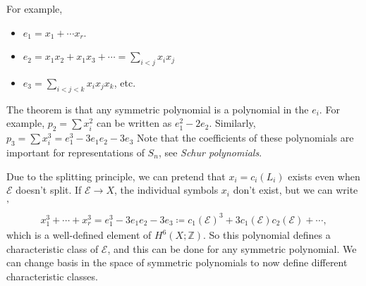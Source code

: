 \begin{example}[?]

For example,

\begin{itemize}
\item
  \(e_1 = x_1 + \cdots x_r\).
\item
  \(e_2 = x_1 x_2 + x_1 x_3 + \cdots = \sum_{i < j} x_i x_j\)
\item
  \(e_3 = \sum_{i<j<k} x_i x_j x_k\), etc.
\end{itemize}

\end{example}

\begin{remark}

The theorem is that any symmetric polynomial is a polynomial in the
\(e_i\). For example, \(p_2 = \sum x_i^2\) can be written as
\(e_1^2 - 2e_2\). Similarly,
\(p_3 = \sum x_i^3 = e_1^3 - 3e_1 e_2 -3e_3\) Note that the coefficients
of these polynomials are important for representations of \(S_n\), see
\emph{Schur polynomials}.

\end{remark}

\begin{remark}

Due to the splitting principle, we can pretend that \(x_i = c_i(L_i)\)
exists even when \(\mathcal{E}\) doesn't split. If
\(\mathcal{E} \to X\), the individual symbols \(x_i\) don't exist, but
we can write '
\begin{align*}
x_1^3 + \cdots + x_r^3 = e_1^3 - 3e_1 e_2 - 3e_3 \coloneqq c_1(\mathcal{E})^3 + 3c_1(\mathcal{E}) c_2(\mathcal{E}) + \cdots
,\end{align*}
which is a well-defined element of \(H^6(X; {\mathbb{Z}})\). So this
polynomial defines a characteristic class of \(\mathcal{E}\), and this
can be done for any symmetric polynomial. We can change basis in the
space of symmetric polynomials to now define different characteristic
classes.

\end{remark}

